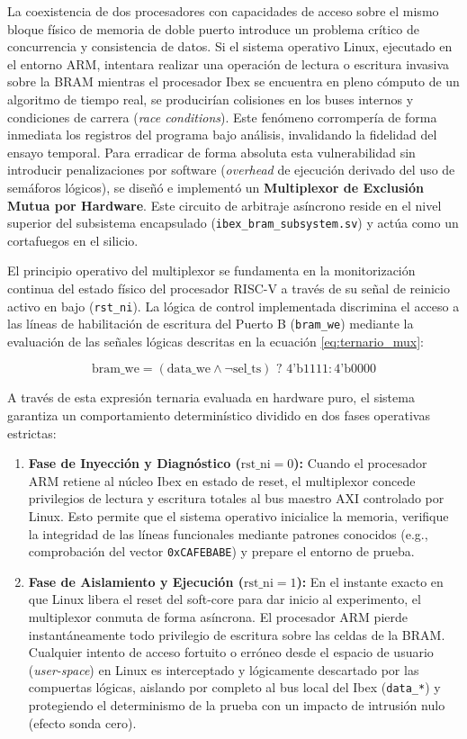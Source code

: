 La coexistencia de dos procesadores con capacidades de acceso sobre el mismo bloque físico de memoria de doble puerto introduce un problema crítico de concurrencia y consistencia de datos. Si el sistema operativo Linux, ejecutado en el entorno ARM, intentara realizar una operación de lectura o escritura invasiva sobre la BRAM mientras el procesador Ibex se encuentra en pleno cómputo de un algoritmo de tiempo real, se producirían colisiones en los buses internos y condiciones de carrera (\textit{race conditions}). Este fenómeno corrompería de forma inmediata los registros del programa bajo análisis, invalidando la fidelidad del ensayo temporal.
Para erradicar de forma absoluta esta vulnerabilidad sin introducir penalizaciones por software (\textit{overhead} de ejecución derivado del uso de semáforos lógicos), se diseñó e implementó un \textbf{Multiplexor de Exclusión Mutua por Hardware}. Este circuito de arbitraje asíncrono reside en el nivel superior del subsistema encapsulado (\texttt{ibex\_bram\_subsystem.sv}) y actúa como un cortafuegos en el silicio.

El principio operativo del multiplexor se fundamenta en la monitorización continua del estado físico del procesador RISC-V a través de su señal de reinicio activo en bajo (\texttt{rst\_ni}). La lógica de control implementada discrimina el acceso a las líneas de habilitación de escritura del Puerto B (\texttt{bram\_we}) mediante la evaluación de las señales lógicas descritas en la ecuación \ref{eq:ternario_mux}:

\begin{equation}
    \label{eq:ternario_mux}
    \text{bram\_we} = (\text{data\_we} \wedge \neg\text{sel\_ts}) \text{ ? } \text{4'b1111} : \text{4'b0000}
\end{equation}

A través de esta expresión ternaria evaluada en hardware puro, el sistema garantiza un comportamiento determinístico dividido en dos fases operativas estrictas:
\begin{enumerate}
    \item \textbf{Fase de Inyección y Diagnóstico ($\text{rst\_ni} = 0$):} Cuando el procesador ARM retiene al núcleo Ibex en estado de reset, el multiplexor concede privilegios de lectura y escritura totales al bus maestro AXI controlado por Linux. Esto permite que el sistema operativo inicialice la memoria, verifique la integridad de las líneas funcionales mediante patrones conocidos (e.g., comprobación del vector \texttt{0xCAFEBABE}) y prepare el entorno de prueba.
    \item \textbf{Fase de Aislamiento y Ejecución ($\text{rst\_ni} = 1$):} En el instante exacto en que Linux libera el reset del soft-core para dar inicio al experimento, el multiplexor conmuta de forma asíncrona. El procesador ARM pierde instantáneamente todo privilegio de escritura sobre las celdas de la BRAM. Cualquier intento de acceso fortuito o erróneo desde el espacio de usuario (\textit{user-space}) en Linux es interceptado y lógicamente descartado por las compuertas lógicas, aislando por completo al bus local del Ibex (\texttt{data\_*}) y protegiendo el determinismo de la prueba con un impacto de intrusión nulo (efecto sonda cero).
\end{enumerate}

